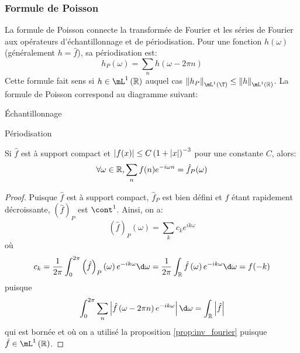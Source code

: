 \documentclass{cours}
\begin{document}
\subsubsection{Formule de Poisson}
La formule de Poisson connecte la transformée de Fourier et les séries de Fourier aux opérateurs d'échantillonnage et de périodisation.
Pour une fonction $h\left(\omega\right)$ (généralement $h = \hat{f}$), sa périodisation est:
\begin{equation*}
	h_{P}\left(\omega\right) = \sum_{n}h(\omega - 2\pi n)
\end{equation*}
Cette formule fait sens si $h \in \mL^{1}\left(\R\right)$ auquel cas $\norm{h_{P}}_{\mL^{1}\left(\T\right)} \leq \norm{h}_{\mL^{1}\left(\R\right)}$.
La formule de Poisson correspond au diagramme suivant:
\begin{center}
	Échantillonnage
Périodisation
\end{center}


\begin{proposition}
	Si $\hat{f}$ est à support compact et $\left|f(x)\right| \leq C\left(1 + \left|x\right|\right)^{-3}$ pour une constante $C$, alors:
	\begin{equation*}
		\forall \omega \in \mathbb{R}, \sum_{n}f(n)e^{-i\omega n} = \hat{f}_{P}(\omega)
	\end{equation*}
	\label{prop:formule_poisson}
\end{proposition}

\begin{proof}
	Puisque $\hat{f}$ est à support compact, $\hat{f}_{P}$ est bien défini et $f$ étant rapidement décroissante, $\left(\hat{f}\right)_{P}$ est $\cont^{1}$.
	Ainsi, on a:
	\begin{equation*}
		\left(\hat{f}\right)_{P}\left(\omega\right) = \sum_{k}c_{k}e^{ik\omega}
	\end{equation*}
	où
	\begin{equation*}
		c_{k} = \frac{1}{2\pi}\int_{0}^{2\pi}\left(\hat{f}\right)_{P}\left(\omega\right)e^{-ik\omega}\d \omega = \frac{1}{2\pi}\int_{\R}\hat{f}\left(\omega\right)e^{-ik\omega}\d \omega = f(-k)
	\end{equation*}
	puisque
	\begin{equation*}
		\int_{0}^{2\pi}\sum_{n}\abs{\hat{f}\left(\omega - 2\pi n\right)e^{-ik\omega}}\d \omega = \int_{\R}\abs{\hat{f}}
	\end{equation*}
	qui est bornée et où on a utilisé la proposition \ref{prop:inv_fourier} puisque $\hat{f}\in \mL^{1}\left(\R\right)$.
\end{proof}
\end{document}
